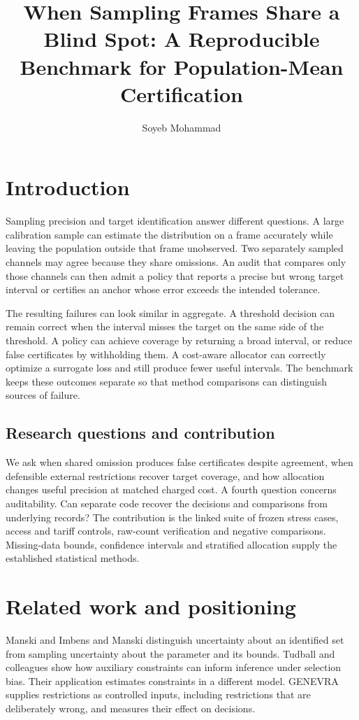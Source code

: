\documentclass[article,nojss]{jss}
\author{Soyeb Mohammad}
\title{When Sampling Frames Share a Blind Spot: A Reproducible Benchmark for Population-Mean Certification}
\begin{document}
\section{Introduction}

Sampling precision and target identification answer different questions.
A large calibration sample can estimate the distribution on a frame
accurately while leaving the population outside that frame unobserved.
Two separately sampled channels may agree because they share omissions.
An audit that compares only those channels can then admit a policy that
reports a precise but wrong target interval or certifies an anchor whose
error exceeds the intended tolerance.

The resulting failures can look similar in aggregate. A threshold
decision can remain correct when the interval misses the target on the
same side of the threshold. A policy can achieve coverage by returning a
broad interval, or reduce false certificates by withholding them. A
cost-aware allocator can correctly optimize a surrogate loss and still
produce fewer useful intervals. The benchmark keeps these outcomes
separate so that method comparisons can distinguish sources of failure.

\subsection{Research questions and contribution}

We ask when shared omission produces false certificates despite
agreement, when defensible external restrictions recover target
coverage, and how allocation changes useful precision at matched charged
cost. A fourth question concerns auditability. Can separate code recover
the decisions and comparisons from underlying records? The contribution
is the linked suite of frozen stress cases, access and tariff controls,
raw-count verification and negative comparisons. Missing-data bounds,
confidence intervals and stratified allocation supply the established
statistical methods.

\section{Related work and positioning}

Manski \citep{manski2005} and Imbens and Manski \citep{imbens2004}
distinguish uncertainty about an identified set from sampling
uncertainty about the parameter and its bounds. Tudball and colleagues
\citep{tudball2023} show how auxiliary constraints can inform inference
under selection bias. Their application estimates constraints in a
different model. GENEVRA supplies restrictions as controlled inputs,
including restrictions that are deliberately wrong, and measures their
effect on decisions.
\end{document}
